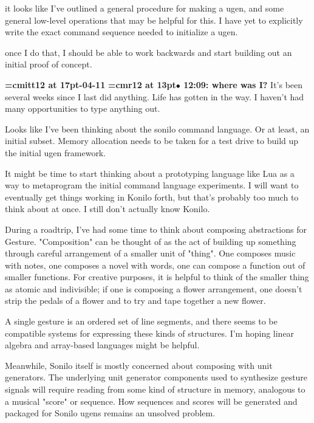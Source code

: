 it looks like I've outlined a general procedure for making a ugen, and some general low-level operations that may be helpful for this. I have yet to explicitly write the exact command sequence needed to initialize a ugen.
\par

once I do that, I should be able to work backwards and start building out an initial proof of concept.
\par

{\medskip\noindent\bf\font\titlefont=cmitt12 at 17pt-04-11}\medskip
{\smallskip\noindent\bf\font\titlefont=cmr12 at 13pt\titlefont $\bullet$ 12:09: where was I?}\smallskip
It's been several weeks since I last did anything. Life has gotten in the way. I haven't had many opportunities to type anything out.
\par

Looks like I've been thinking about the sonilo command language. Or at least, an initial subset. Memory allocation needs to be taken for a test drive to build up the initial ugen framework.
\par

It might be time to start thinking about a prototyping language like Lua as a way to metaprogram the initial command language experiments. I will want to eventually get things working in Konilo forth, but that's probably too much to think about at once. I still don't actually know Konilo.
\par

During a roadtrip, I've had some time to think about composing abstractions for Gesture. "Composition" can be thought of as the act of building up something through careful arrangement of a smaller unit of "thing". One composes music with notes, one composes a novel with words, one can compose a function out of smaller functions. For creative purposes, it is helpful to think of the smaller thing as atomic and indivisible; if one is composing a flower arrangement, one doesn't strip the pedals of a flower and to try and tape together a new flower.
\par

A single gesture is an ordered set of line segments, and there seems to be compatible systems for expressing these kinds of structures. I'm hoping linear algebra and array-based languages might be helpful.
\par

Meanwhile, Sonilo itself is mostly concerned about composing with unit generators. The underlying unit generator components used to synthesize gesture signals will require reading from some kind of structure in memory, analogous to a musical "score" or sequence. How sequences and scores will be generated and packaged for Sonilo ugens remains an unsolved problem.
\par

